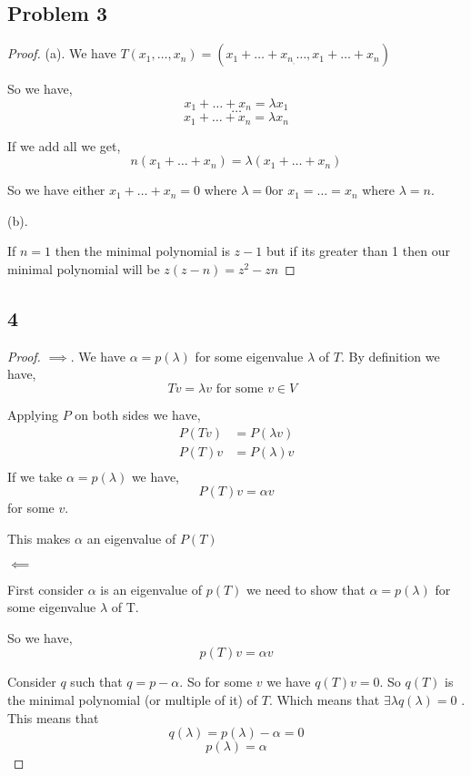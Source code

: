 \documentclass[a4paper]{report}
\begin{document}
\subsection*{Problem 3}
\begin{proof}
   (a). We have $T(x_1,\dots,x_n) = (x_1 + \dots + x_n_, \dots, x_1 + \dots + x_n)$

   So we have, 
   $$ x_1 + \dots + x_n = \lambda x_1 $$ 
   $$ \dots $$ 
   $$ x_1 + \dots + x_n = \lambda x_n $$ 

   If we add all we get, 
   $$ n( x_1 + \dots + x_n) = \lambda (x_1 + \dots + x_n) $$ 

   So we have either $x_1 + \dots + x_n = 0$ where $\lambda = 0$or $x_1 = \dots = x_n$ where $\lambda = n$.

   (b).

   If $n = 1$ then the minimal polynomial is $z - 1$ but if its greater than 1 then our minimal polynomial will be $z(z - n) = z^2 - zn$
\end{proof}


\subsection*{4}
\begin{proof}
   $\implies$. We have $\alpha = p(\lambda)$ for some eigenvalue $\lambda$ of $T$. By definition we have, 
   $$ Tv = \lambda v  \text{ for some $v \in V$ }$$  

   Applying $P$ on both sides we have, 
   \begin{align*}
      P(Tv) &= P(\lambda v)\\
      P(T)v &= P(\lambda) v\\
   \end{align*}
   If we take $\alpha = p(\lambda)$ we have, 
   $$ P(T)v = \alpha v $$ for some $v$.

   This makes $\alpha$ an eigenvalue of $P(T)$ 

   $\impliedby$

   First consider  $\alpha$ is an eigenvalue of $p(T)$ we need to show that $\alpha = p(\lambda)$ for some eigenvalue $\lambda$ of T.

   So we have, 
   $$ p(T) v = \alpha v $$ 

   Consider $q$ such that $q = p - \alpha$. So for some $v$ we have $q(T)v = 0$. So  $q(T)$ is the minimal polynomial (or multiple of it) of $T$. Which means that $\exists \lambda q(\lambda) = 0$ . This means that 
   $$ q(\lambda) =  p(\lambda) - \alpha = 0  $$ 
   $$ p(\lambda)  = \alpha$$ 
\end{proof}
\end{document}
